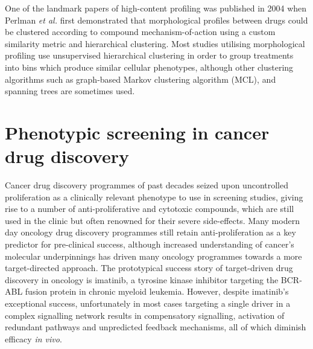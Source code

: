 \documentclass[a4paper,11pt,twoside,openright]{scrbook}
\begin{document}
One of the landmark papers of high-content profiling was published in 2004 when Perlman \textit{et al.} \cite{Perlman2004} first demonstrated that morphological profiles between drugs could be clustered according to compound mechanism-of-action using a custom similarity metric and hierarchical clustering.
Most studies utilising morphological profiling use unsupervised hierarchical clustering in order to group treatments into bins which produce similar cellular phenotypes, \cite{Gustafsdottir2013,Young2008} although other clustering algorithms such as graph-based Markov clustering algorithm (MCL), \cite{Reisen2015,VanDongen2008} and spanning trees \cite{Qiu2011} are sometimes used.




\section{Phenotypic screening in cancer drug discovery}
Cancer drug discovery programmes of past decades seized upon uncontrolled proliferation as a clinically relevant phenotype to use in screening studies, giving rise to a number of anti-proliferative and cytotoxic compounds, which are still used in the clinic but often renowned for their severe side-effects.
Many modern day oncology drug discovery programmes still retain anti-proliferation as a key predictor for pre-clinical success, although increased understanding of cancer's molecular underpinnings has driven many oncology programmes towards a more target-directed approach.
The prototypical success story of target-driven drug discovery in oncology is imatinib, a tyrosine kinase inhibitor targeting the BCR-ABL fusion protein in chronic myeloid leukemia.
However, despite imatinib's exceptional success, unfortunately in most cases targeting a single driver in a complex signalling network results in compensatory signalling, activation of redundant pathways and unpredicted feedback mechanisms, all of which diminish efficacy \textit{in vivo}.
\end{document}
